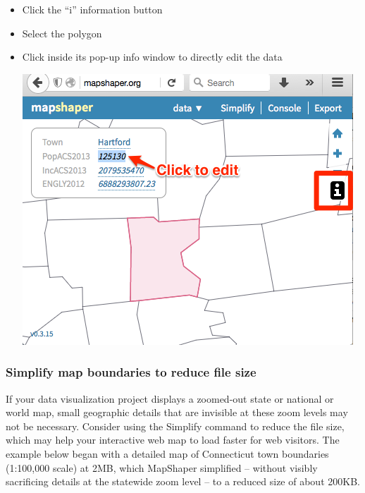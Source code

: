 \documentclass[
  english,
]{book}
\begin{document}
\begin{itemize}
\item
  Click the ``i'' information button
\item
  Select the polygon
\item
  Click inside its pop-up info window to directly edit the data

  \includegraphics{images/09-transform/mapshaper-edit-info.png}
\end{itemize}

\hypertarget{simplify-map-boundaries-to-reduce-file-size}{%
\subsubsection*{Simplify map boundaries to reduce file size}\label{simplify-map-boundaries-to-reduce-file-size}}

If your data visualization project displays a zoomed-out state or national or world map, small geographic details that are invisible at these zoom levels may not be necessary. Consider using the Simplify command to reduce the file size, which may help your interactive web map to load faster for web visitors. The example below began with a detailed map of Connecticut town boundaries (1:100,000 scale) at 2MB, which MapShaper simplified -- without visibly sacrificing details at the statewide zoom level -- to a reduced size of about 200KB.
\end{document}
